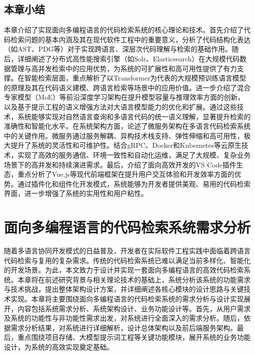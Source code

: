 \documentclass[UTF8,a4paper,12pt]{ctexart}
\numberwithin{equation}{section}
\begin{document}
\subsection{本章小结}
本章介绍了实现面向多编程语言的代码检索系统的核心理论和技术。首先介绍了代码检索问题的基本内涵及其在现代软件工程中的重要意义，分析了代码结构化表达（如AST、PDG等）对于实现跨语言、深层次代码理解与检索的基础作用。随后，详细阐述了分布式高性能搜索引擎（如Solr、Elasticsearch）在大规模代码数据管理与高并发检索中的应用优势，为系统的可扩展性和高可用性提供了有力支撑。在智能检索层面，重点解析了以Transformer为代表的大规模预训练语言模型的原理及其在代码语义建模、跨语言检索等场景中的应用价值。进一步介绍了混合专家模型（MoE）等前沿深度学习架构在提升模型容量与推理效率方面的创新，以及基于提示工程的语义增强方法对大语言模型能力的优化和扩展。通过这些技术，系统能够实现对自然语言查询和多语言代码的统一语义理解，显著提升检索的准确性和智能化水平。在系统架构方面，论述了微服务架构在多语言代码检索系统中的关键作用。微服务通过服务解耦、异构技术栈支持、弹性伸缩和高可用性，极大提升了系统的灵活性和可维护性。结合gRPC、Docker和Kubernetes等云原生技术，实现了高效的服务通信、环境一致性和自动化运维，满足了大规模、复杂业务场景下的高并发和持续演进需求。最后，介绍了面向高效开发的VS Code插件生态，重点分析了Vue.js等现代前端框架在提升用户交互体验和开发效率方面的优势。通过插件化和组件化开发模式，系统能够为开发者提供美观、易用的代码检索界面，进一步增强了系统的实用性和用户粘性。
\newpage
{}
\section{面向多编程语言的代码检索系统需求分析}
随着多语言协同开发模式的日益普及，开发者在实际软件工程实践中面临着跨语言代码检索与复用的复杂需求。传统的代码检索系统已难以满足当前多样化、智能化的开发场景。为此，本文致力于设计并实现一套面向多编程语言的高效代码检索系统。本章将在前述研究背景与相关理论技术的基础上，系统分析该系统的功能需求与技术挑战，提出整体架构设计方案，并详细阐述各核心模块的设计思路与关键技术实现。本章将主要围绕面向多编程语言的代码检索系统的需求分析与设计实现展开，内容包括系统需求分析、系统架构设计、业务功能设计等。首先，从用户需求及系统的功能性与非功能性需求出发，对系统进行全面深入的需求分析。随后，依据需求分析结果，对系统进行详细解析，设计总体架构以及前后端服务架构。最后，重点围绕项目存储、大模型提示词工程等关键功能模块，展开系统的业务功能设计，为系统的高效实现奠定基础。
\end{document}
